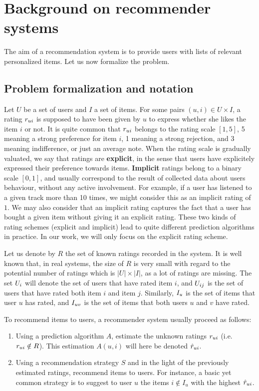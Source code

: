 \section{Background on recommender systems}
\label{sec:background_RS}

The aim of a recommendation system is to provide users with lists of relevant
personalized items.  Let us now formalize the problem.

\subsection{Problem formalization and notation}
Let $U$ be a set of users and $I$ a set of items. For some pairs $(u,i) \in U
\times I$, a rating  $r_{ui}$ is supposed to have been given by $u$ to express
whether she likes the item $i$ or not.  It is quite common that  $r_{ui}$ belongs
to the rating scale $[1, 5]$, 5 meaning a strong preference for item $i$, 1
meaning a strong rejection, and 3 meaning indifference, or just an average
note. When the rating scale is gradually valuated, we say that ratings are
\textbf{explicit}, in the sense that users have explicitely expressed their
preference towards items. \textbf{Implicit} ratings belong to a binary scale $[0,
1]$, and usually correspond to the result of collected data about users
behaviour, without any active involvement. For example, if a user has listened to a given track more than 10
times, we might consider this as an implicit rating of $1$. We may also
consider that an implicit rating captures the fact that a user has bought a
given item without giving it an explicit rating. These two kinds of rating
schemes (explicit and implicit) lead to quite different prediction algorithms
in practice. In our work, we will only focus on the explicit rating
scheme.

Let us denote by $R$ the set of known ratings recorded in the system. It is
well known that, in real systems, the size of $R$ is very small with regard to
the potential number of ratings which is $|U| \times |I|$, as a lot of ratings
are missing. The set $U_i$ will denote the set of users that have rated item
$i$, and $U_{ij}$ is the set of users that have rated both item $i$ and item $j$.
Similarly, $I_u$ is the set of items that user $u$ has rated, and $I_{uv}$ is the
set of items that both users $u$ and $v$ have rated.

To recommend items to users, a recommender system usually proceed as follows:
\begin{enumerate}
\item Using a prediction algorithm $A$, estimate the unknown ratings $r_{ui}$
  (i.e. $r_{ui} \notin R$). This estimation $A(u, i)$ will here be denoted
    $\hat{r}_{ui}$.
\item Using a recommendation strategy $S$ and in the light of the previously
  estimated ratings, recommend items to users. For instance, a basic yet common
    strategy is to suggest to user $u$ the items $i \notin I_u$ with the
    highest $\hat{r}_{ui}$.
\end{enumerate}

